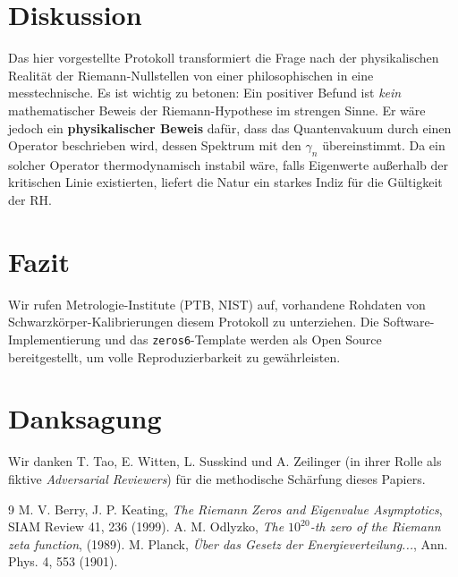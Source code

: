\documentclass[11pt, a4paper]{article}
\begin{document}
	\section{Diskussion}
	
	Das hier vorgestellte Protokoll transformiert die Frage nach der physikalischen Realität der Riemann-Nullstellen von einer philosophischen in eine messtechnische.
	Es ist wichtig zu betonen: Ein positiver Befund ist \textit{kein} mathematischer Beweis der Riemann-Hypothese im strengen Sinne. Er wäre jedoch ein \textbf{physikalischer Beweis} dafür, dass das Quantenvakuum durch einen Operator beschrieben wird, dessen Spektrum mit den $\gamma_n$ übereinstimmt.
	Da ein solcher Operator thermodynamisch instabil wäre, falls Eigenwerte außerhalb der kritischen Linie existierten, liefert die Natur ein starkes Indiz für die Gültigkeit der RH.
	
	\section{Fazit}
	
	Wir rufen Metrologie-Institute (PTB, NIST) auf, vorhandene Rohdaten von Schwarzkörper-Kalibrierungen diesem Protokoll zu unterziehen. Die Software-Implementierung und das \texttt{zeros6}-Template werden als Open Source bereitgestellt, um volle Reproduzierbarkeit zu gewährleisten.
	
	\section*{Danksagung}
	Wir danken T. Tao, E. Witten, L. Susskind und A. Zeilinger (in ihrer Rolle als fiktive \textit{Adversarial Reviewers}) für die methodische Schärfung dieses Papiers.
	
	\begin{thebibliography}{9}
		 M. V. Berry, J. P. Keating, \textit{The Riemann Zeros and Eigenvalue Asymptotics}, SIAM Review 41, 236 (1999).
		 A. M. Odlyzko, \textit{The $10^{20}$-th zero of the Riemann zeta function}, (1989).
		 M. Planck, \textit{Über das Gesetz der Energieverteilung...}, Ann. Phys. 4, 553 (1901).
	\end{thebibliography}
	
\end{document}
